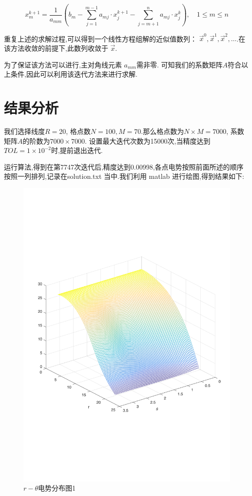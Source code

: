 \begin{equation}
x _ { m } ^ { k + 1 } = \frac { 1 } { a _ { m m } } \left( b _ { m } - \sum _ { j = 1 } ^ { m - 1 } a _ { m j } \cdot x _ { j } ^ { k + 1 } - \sum _ { j = m + 1 } ^ { n } a _ { m j } \cdot x _ { j } ^ { k } \right) , \quad 1 \leq m \leq n
\end{equation}

重复上述的求解过程,可以得到一个线性方程组解的近似值数列： ${\displaystyle {\vec {x}}^{0},{\vec {x}}^{1},{\vec {x}}^{2},\ldots } $.在该方法收敛的前提下,此数列收敛于 $ \vec{x}$.

为了保证该方法可以进行,主对角线元素 $ {\displaystyle a_{mm}}$需非零. 可知我们的系数矩阵$A$符合以上条件,因此可以利用该迭代方法来进行求解.

\section{结果分析}

我们选择线度$R = 20$, 格点数$N=100, M=70$.那么格点数为$N\times M=7000$, 系数矩阵$A$的阶数为$7000\times 7000$. 设置最大迭代次数为15000次,当精度达到$TOL=1\times 10^{-2}$时,提前退出迭代.

运行算法,得到在第7747次迭代后,精度达到0.00998,各点电势按照前面所述的顺序按照一列排列,记录在solution.txt 当中.我们利用 matlab 进行绘图,得到结果如下:
\begin{figure}[htp]
    \centering
    \includegraphics[scale = 0.5]{pic/1.pdf}
    \caption{$r-\theta$电势分布图1}
\end{figure}

